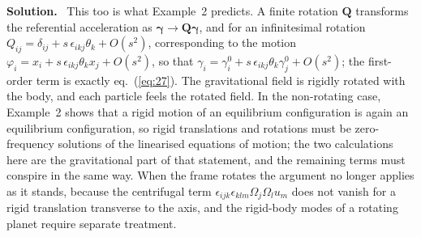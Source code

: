 \documentclass[a4paper,12pt]{paper}
\newenvironment{solution}{\par\noindent\textbf{Solution.}\ }{\par\medskip}
\begin{document}
\begin{solution}
This too is what Example~2 predicts. A finite rotation $\mathbf{Q}$ transforms the referential
acceleration as $\bm{\gamma}\rightarrow\mathbf{Q}\bm{\gamma}$, and for an infinitesimal rotation
$Q_{ij}=\delta_{ij}+s\,\epsilon_{ikj}\theta_{k}+O(s^{2})$, corresponding to the motion
$\varphi_{i}=x_{i}+s\,\epsilon_{ikj}\theta_{k}x_{j}+O(s^{2})$, so that
$\gamma_{i}=\gamma_{i}^{0}+s\,\epsilon_{ikj}\theta_{k}\gamma_{j}^{0}+O(s^{2})$; the first-order term is exactly
eq.~(\ref{eq:27}). The gravitational field is rigidly rotated with the body, and each particle feels
the rotated field. In the non-rotating case, Example~2 shows that a rigid motion of an equilibrium
configuration is again an equilibrium configuration, so rigid translations and rotations must be
zero-frequency solutions of the linearised equations of motion; the two calculations here are the
gravitational part of that statement, and the remaining terms must conspire in the same way. When the
frame rotates the argument no longer applies as it stands, because the centrifugal term
$\epsilon_{ijk}\epsilon_{klm}\Omega_{j}\Omega_{l}u_{m}$ does not vanish for a rigid translation
transverse to the axis, and the rigid-body modes of a rotating planet require separate treatment.
\end{solution}
\end{document}

